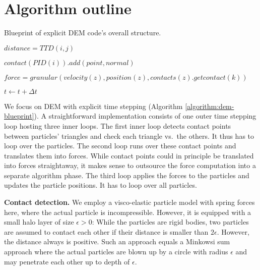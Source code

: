 \section{Algorithm outline}
\label{section:algorithm}
 
\begin{algorithm}
 
   Blueprint of explicit DEM code's overall structure.
 
 \label{algorithm:dem-blueprint}
 \begin{algorithmic}[1]
   

				
			\State $distance = TTD(i,j)$
				

				\State $contact(PID(i)).add(point, normal)$

			\EndIf
			
		\EndFor
			
	\EndFor




			\State $force = granular(velocity(z), position(z), contacts(z).getcontact(k))$

		\EndFor
	
	\EndFor    
    
     \State $t \gets t + \Delta t$
   \EndFor   

 \end{algorithmic}
\end{algorithm} 


We focus on DEM with explicit time stepping (Algorithm \ref{algorithm:dem-blueprint}). 
A straightforward implementation consists of one outer time stepping loop
hosting three inner loops. 
The first inner loop detects contact points between particles' triangles and
check each triangle vs.~the others.
It thus has to loop over the particles.
The second loop runs over these contact points and translates them into forces.
While contact points could in principle be translated into forces straightaway,
it makes sense to outsource the force computation into a separate algorithm
phase.
The third loop applies the forces to the particles and updates the particle
positions.
It has to loop over all particles.


{\bf Contact detection.}
We employ a visco-elastic particle model with spring forces here, where the
actual particle is incompressible.
However, it is equipped with a small halo layer of size $\epsilon >0$:
While the particles are rigid bodies, two particles are assumed to contact each
other if their distance is smaller than $2\epsilon$. 
However, the distance always is positive.
Such an approach equals a Minkowsi sum approach where the actual particles are
blown up by a circle with radius $\epsilon$ and may penetrate each other up to
depth of $\epsilon $.


